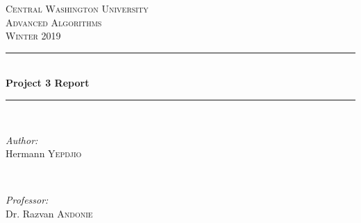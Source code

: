 \documentclass[12pt]{article}
\begin{document}
	
	\begin{titlepage}
		
		\newcommand{\HRule}{\rule{\linewidth}{0.5mm}} %
		
		\center %
		
		
		\textsc{\LARGE Central Washington University}\\[1.5cm] %
		\textsc{\Large Advanced Algorithms}\\[0.5cm] %
		\textsc{\large Winter 2019}\\[0.5cm] %
		
		
		\HRule \\[0.4cm]
		{ \huge \bfseries Project 3 Report}\\[0.4cm] %
		\HRule \\[1.5cm]
		
		
		\begin{minipage}{0.4\textwidth}
			\begin{flushleft} \large
				\emph{Author:}\\
				Hermann \textsc{Yepdjio} %
			\end{flushleft}
		\end{minipage}
		~
		\begin{minipage}{0.4\textwidth}
			\begin{flushright} \large
				\emph{Professor:} \\
				Dr. Razvan \textsc{Andonie} %
			\end{flushright}
		\end{minipage}\\[1cm]
		

\end{titlepage}
\end{document}
